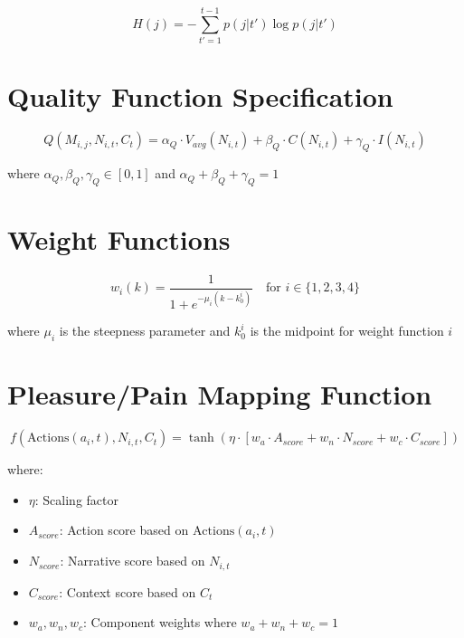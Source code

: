 \documentclass[12pt, a4paper]{article}
\begin{document}
\begin{equation}
H(j) = -\sum_{t'=1}^{t-1} p(j|t') \log p(j|t')
\end{equation}

\section{Quality Function Specification}

\begin{equation}
Q(M_{i,j}, N_{i,t}, C_t) = \alpha_Q \cdot V_{avg}(N_{i,t}) + \beta_Q \cdot C(N_{i,t}) + \gamma_Q \cdot I(N_{i,t})
\end{equation}

where \( \alpha_Q, \beta_Q, \gamma_Q \in [0,1] \) and \( \alpha_Q + \beta_Q + \gamma_Q = 1 \)

\section{Weight Functions}

\begin{equation}
w_i(k) = \frac{1}{1 + e^{-\mu_i(k-k_0^i)}} \quad \text{for } i \in \{1,2,3,4\}
\end{equation}

where \( \mu_i \) is the steepness parameter and \( k_0^i \) is the midpoint for weight function \( i \)

\section{Pleasure/Pain Mapping Function}

\begin{equation}
f(\text{Actions}(a_i, t), N_{i,t}, C_t) = \tanh(\eta \cdot [w_a \cdot A_{score} + w_n \cdot N_{score} + w_c \cdot C_{score}])
\end{equation}

where:
\begin{itemize}
    \item \( \eta \): Scaling factor
    \item \( A_{score} \): Action score based on \( \text{Actions}(a_i, t) \)
    \item \( N_{score} \): Narrative score based on \( N_{i,t} \)
    \item \( C_{score} \): Context score based on \( C_t \)
    \item \( w_a, w_n, w_c \): Component weights where \( w_a + w_n + w_c = 1 \)
\end{itemize}
\end{document}
